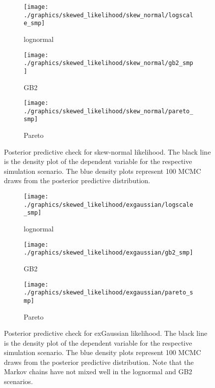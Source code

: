 \begin{figure}[t]
    \centering
    \begin{subfigure}{0.29\textwidth}
        \texttt{[image: ./graphics/skewed\_likelihood/skew\_normal/logscale\_smp]}
        \caption{lognormal}
    \end{subfigure}
    \begin{subfigure}{0.29\textwidth}
        \texttt{[image: ./graphics/skewed\_likelihood/skew\_normal/gb2\_smp]}
        \caption{GB2}
    \end{subfigure}
    \begin{subfigure}{0.29\textwidth}
        \texttt{[image: ./graphics/skewed\_likelihood/skew\_normal/pareto\_smp]}
        \caption{Pareto}
    \end{subfigure}
    \label{fig:skewnormal_ppc}
    \caption[Posterior predictive check for skew-normal likelihood]{Posterior predictive check for skew-normal likelihood. The black line is the density plot of the dependent variable for the respective simulation scenario. The blue density plots represent 100 MCMC draws from the posterior predictive distribution.}
\end{figure}
\vspace{-1cm}
\begin{figure}[h]
    \centering
    \begin{subfigure}{0.29\textwidth}
        \texttt{[image: ./graphics/skewed\_likelihood/exgaussian/logscale\_smp]}
        \caption{lognormal}
    \end{subfigure}
    \begin{subfigure}{0.29\textwidth}
        \texttt{[image: ./graphics/skewed\_likelihood/exgaussian/gb2\_smp]}
        \caption{GB2}
    \end{subfigure}
    \begin{subfigure}{0.29\textwidth}
        \texttt{[image: ./graphics/skewed\_likelihood/exgaussian/pareto\_smp]}
        \caption{Pareto}
    \end{subfigure}
    \label{fig:exgaussian_ppc}
    \caption[Posterior predictive check for exGaussian likelihood]{Posterior predictive check for exGaussian likelihood. The black line is the density plot of the dependent variable for the respective simulation scenario. The blue density plots represent 100 MCMC draws from the posterior predictive distribution. Note that the Markov chains have not mixed well in the lognormal and GB2 scenarios.}
\end{figure}

